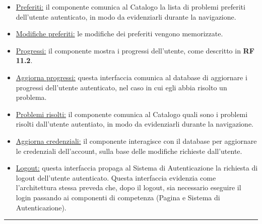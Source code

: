 \documentclass[11pt, a4paper]{article}
\theoremstyle{definition} %
\begin{document}
\begin{description}
\begin{itemize}
        \item \underline{Preferiti:} il componente comunica al Catalogo la
        lista di problemi preferiti dell'utente autenticato, in modo da
        evidenziarli durante la navigazione.

        \item \underline{Modifiche preferiti:} le modifiche dei preferiti
        vengono memorizzate.

        \item \underline{Progressi:} il componente mostra i progressi dell'utente,
        come descritto in \textbf{RF 11.2}.

        \item \underline{Aggiorna progressi:} questa interfaccia comunica al
        database di aggiornare i progressi dell'utente autenticato, nel caso
        in cui egli abbia risolto un problema.

        \item \underline{Problemi risolti:} il componente comunica al Catalogo
        quali sono i problemi risolti dall'utente autentiato, in modo da
        evidenziarli durante la navigazione.

        \item \underline{Aggiorna credenziali:} il componente interagisce con
        il database per aggiornare le credenziali dell'account, sulla base delle
        modifiche richieste dall'utente.
        
        \item \underline{Logout:} questa interfaccia propaga al
        Sistema di Autenticazione la richiesta di logout dell'utente autenticato.
        Questa interfaccia evidenzia come l'architettura stessa preveda che,
        dopo il logout, sia necessario eseguire il login passando ai componenti
        di competenza (Pagina e Sistema di Autenticazione).
    \end{itemize}
\end{description}

\begin{center}
    \rule{5cm}{1pt}
\end{center}
\end{document}
